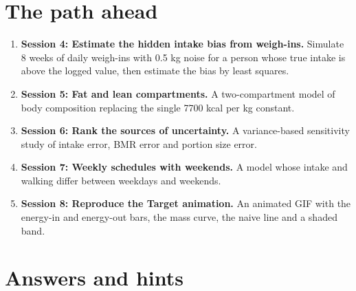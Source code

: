 \documentclass[11pt,a4paper]{article}
\begin{document}
\section{The path ahead}
\begin{enumerate}[nosep]
\item \textbf{Session 4: Estimate the hidden intake bias from weigh-ins.} Simulate 8 weeks of daily weigh-ins with 0.5 kg noise for a person whose true intake is above the logged value, then estimate the bias by least squares.
\item \textbf{Session 5: Fat and lean compartments.} A two-compartment model of body composition replacing the single 7700 kcal per kg constant.
\item \textbf{Session 6: Rank the sources of uncertainty.} A variance-based sensitivity study of intake error, BMR error and portion size error.
\item \textbf{Session 7: Weekly schedules with weekends.} A model whose intake and walking differ between weekdays and weekends.
\item \textbf{Session 8: Reproduce the Target animation.} An animated GIF with the energy-in and energy-out bars, the mass curve, the naive line and a shaded band.
\end{enumerate}

\section{Answers and hints}
\end{document}
